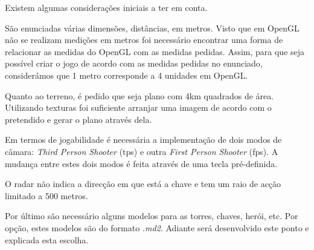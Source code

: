 % 

Existem algumas considerações iniciais a ter em conta.

São enunciadas várias dimensões, distâncias, em metros. Visto que em OpenGL não se realizam medições em metros foi necessário encontrar uma forma de relacionar as medidas do OpenGL com as medidas pedidas.
Assim, para que seja possível criar o jogo de acordo com as medidas pedidas no enunciado, considerámos que 1 metro corresponde a 4 unidades em OpenGL.

Quanto ao terreno, é pedido que seja plano com 4km quadrados de área. Utilizando texturas foi suficiente arranjar uma imagem de acordo com o pretendido e gerar o plano através dela.

Em termos de jogabilidade é necessária a implementação de dois modos de câmara: \textit{Third Person Shooter} (tps) e outra \textit{First Person Shooter} (fps).
A mudança entre estes dois modos é feita através de uma tecla pré-definida.

O radar não indica a direcção em que está a chave e tem um raio de acção limitado a 500 metros.

Por último são necessário alguns modelos para as torres, chaves, herói, etc. Por opção, estes modelos são do formato \textit{.md2}. Adiante será desenvolvido este ponto e explicada esta escolha.

